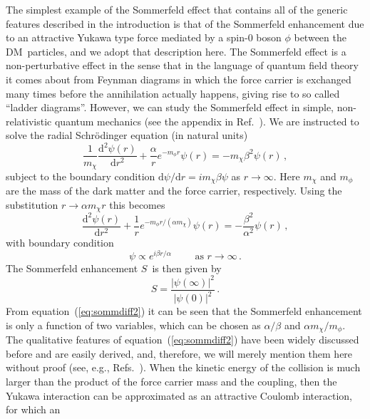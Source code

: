 \documentclass[aps,prd,twocolumn,amsmath,amssymb,floatfix,nofootinbib,10pt]{revtex4}
\newcommand{\eg}{e.g.}
\newcommand{\DM}{DM}
\newcommand{\somm}{\ensuremath{S}}
\newcommand{\mdm}{\ensuremath{m_{\chi}}}
\newcommand{\mv}{\ensuremath{m_{\phi}}}
\newcommand{\dd}{\mathrm{d}}
\newcommand{\eqnname}{equation}
\begin{document}
The simplest example of the Sommerfeld effect that contains all of the
generic features described in the introduction is that of the
Sommerfeld enhancement due to an attractive Yukawa type force mediated
by a spin-0 boson $\phi$ between the \DM\ particles, and we adopt that
description here. The Sommerfeld effect is a non-perturbative effect
in the sense that in the language of quantum field theory it comes
about from Feynman diagrams in which the force carrier is exchanged
many times before the annihilation actually happens, giving rise to so
called ``ladder diagrams''. However, we can study the Sommerfeld
effect in simple, non-relativistic quantum mechanics (see the appendix
in Ref.~\cite{ArkaniHamed:2008qn}). We are instructed to solve the
radial Schr{\"o}dinger equation (in natural units)
\begin{equation}\label{eq:sommdiff1}
\frac{1}{\mdm} \frac{\dd^2 \psi(r)}{\dd r^2} + \frac{\alpha}{r}e^{-\mv r} \psi(r) = -\mdm \beta^2 \psi(r)\, ,
\end{equation}
subject to the boundary condition $\dd\psi/\dd r = i \mdm \beta \psi$
as $r \rightarrow \infty$. Here $\mdm$ and $\mv$ are the mass of the
dark matter and the force carrier, respectively. Using the
substitution $r \rightarrow \alpha \mdm r$ this becomes
\begin{equation}\label{eq:sommdiff2}
\frac{\dd^2 \psi(r)}{\dd r^2} + \frac{1}{r}e^{-\mv r/(\alpha \mdm)} \psi(r) = -\frac{\beta^2}{\alpha^2} \psi(r)\, ,
\end{equation}
with boundary condition
\begin{equation}
\psi \propto e^{i\beta r/\alpha} \qquad \mbox{ as } r \rightarrow\infty\, .
\end{equation}
The Sommerfeld enhancement \somm\ is then given by
\begin{equation}
\somm = \frac{|\psi(\infty)|^2}{|\psi(0)|^2}\, .
\end{equation}
From \eqnname\ (\ref{eq:sommdiff2}) it can be seen that the Sommerfeld
enhancement is only a function of two variables, which can be chosen
as $\alpha/\beta$ and $\alpha \mdm/\mv$. The qualitative features of
\eqnname\ (\ref{eq:sommdiff2}) have been widely discussed before and
are easily derived, and, therefore, we will merely mention them here
without proof (see, \eg,
Refs.~\cite{ArkaniHamed:2008qn,2008arXiv0812.0360L}). When the kinetic
energy of the collision is much larger than the product of the force
carrier mass and the coupling, then the Yukawa interaction can be
approximated as an attractive Coulomb interaction, for which an
\end{document}
